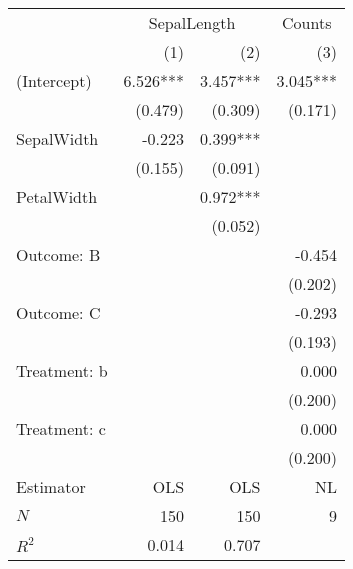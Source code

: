 \begin{tabular}{lrrr}
\toprule
                          & \multicolumn{2}{c}{SepalLength} & \multicolumn{1}{c}{Counts} \\ 
\cmidrule(lr){2-3} \cmidrule(lr){4-4} 
                          &      (1) &                  (2) &                        (3) \\ 
\midrule
(Intercept)               & 6.526*** &             3.457*** &                   3.045*** \\ 
                          &  (0.479) &              (0.309) &                    (0.171) \\ 
SepalWidth                &   -0.223 &             0.399*** &                            \\ 
                          &  (0.155) &              (0.091) &                            \\ 
PetalWidth                &          &             0.972*** &                            \\ 
                          &          &              (0.052) &                            \\ 
Outcome: B                &          &                      &                     -0.454 \\ 
                          &          &                      &                    (0.202) \\ 
Outcome: C                &          &                      &                     -0.293 \\ 
                          &          &                      &                    (0.193) \\ 
Treatment: b              &          &                      &                      0.000 \\ 
                          &          &                      &                    (0.200) \\ 
Treatment: c              &          &                      &                      0.000 \\ 
                          &          &                      &                    (0.200) \\ 
\midrule
Estimator                 &      OLS &                  OLS &                         NL \\ 
\midrule
$N$                       &      150 &                  150 &                          9 \\ 
$R^2$                     &    0.014 &                0.707 &                            \\ 

\end{tabular}
